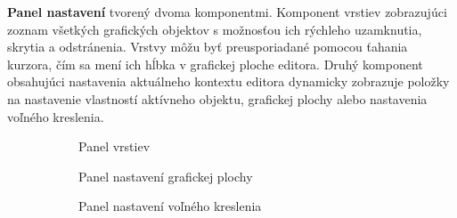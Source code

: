 	
\textbf{Panel nastavení} tvorený dvoma komponentmi. Komponent vrstiev zobrazujúci zoznam všetkých grafických objektov s možnosťou ich rýchleho uzamknutia, skrytia a odstránenia. Vrstvy môžu byť preusporiadané pomocou ťahania kurzora, čím sa mení ich hĺbka v grafickej ploche editora. Druhý komponent obsahujúci nastavenia aktuálneho kontextu editora dynamicky zobrazuje položky na nastavenie vlastností aktívneho objektu, grafickej plochy alebo nastavenia voľného kreslenia.
\begin{figure}[H]
	\centering
	\begin{subfigure}[t]{0.3\linewidth}	
		\caption{Panel vrstiev }
	\end{subfigure}
	\quad
	\begin{subfigure}[t]{0.3\linewidth}	
		\caption{Panel nastavení grafickej plochy}
	\end{subfigure}
	\quad
	\begin{subfigure}[t]{0.3\linewidth}	
		\caption{Panel nastavení voľného kreslenia}
	\end{subfigure}
	\quad
	\begin{subfigure}[t]{0.48\linewidth}	

\end{subfigure}
\end{figure}
